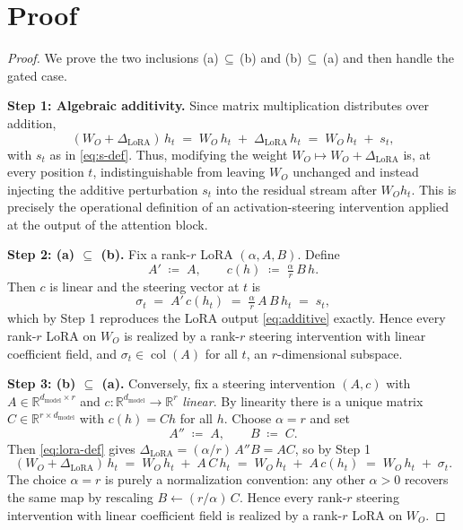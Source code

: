 \documentclass[11pt]{article}
\begin{document}
\section*{Proof}

\begin{proof}
We prove the two inclusions (a)\,$\subseteq$\,(b) and (b)\,$\subseteq$\,(a) and then handle the gated case.

\smallskip

\noindent\textbf{Step 1: Algebraic additivity.}
Since matrix multiplication distributes over addition,
\begin{equation}
(W_O + \Delta_{\mathrm{LoRA}})\, h_t
\;=\; W_O\, h_t \;+\; \Delta_{\mathrm{LoRA}}\, h_t
\;=\; W_O\, h_t \;+\; s_t,
\label{eq:algebra}
\end{equation}
with $s_t$ as in \eqref{eq:s-def}. Thus, modifying the weight $W_O \mapsto W_O + \Delta_{\mathrm{LoRA}}$ is, at every position $t$, indistinguishable from leaving $W_O$ unchanged and instead injecting the additive perturbation $s_t$ into the residual stream after $W_O h_t$. This is precisely the operational definition of an activation-steering intervention applied at the output of the attention block.

\smallskip

\noindent\textbf{Step 2: (a) $\subseteq$ (b).}
Fix a rank-$r$ LoRA $(\alpha, A, B)$. Define
\[
A' \;\coloneqq\; A, \qquad c(h) \;\coloneqq\; \tfrac{\alpha}{r}\, B\, h.
\]
Then $c$ is linear and the steering vector at $t$ is
\[
\sigma_t \;=\; A'\, c(h_t) \;=\; \tfrac{\alpha}{r}\, A\, B\, h_t \;=\; s_t,
\]
which by Step 1 reproduces the LoRA output \eqref{eq:additive} exactly. Hence every rank-$r$ LoRA on $W_O$ is realized by a rank-$r$ steering intervention with linear coefficient field, and $\sigma_t \in \operatorname{col}(A)$ for all $t$, an $r$-dimensional subspace.

\smallskip

\noindent\textbf{Step 3: (b) $\subseteq$ (a).}
Conversely, fix a steering intervention $(A, c)$ with $A \in \mathbb{R}^{d_{\mathrm{model}}\times r}$ and $c : \mathbb{R}^{d_{\mathrm{model}}} \to \mathbb{R}^r$ \emph{linear}. By linearity there is a unique matrix $C \in \mathbb{R}^{r \times d_{\mathrm{model}}}$ with $c(h) = C h$ for all $h$.
Choose $\alpha = r$ and set
\[
A'' \;\coloneqq\; A, \qquad B \;\coloneqq\; C.
\]
Then \eqref{eq:lora-def} gives $\Delta_{\mathrm{LoRA}} = (\alpha/r)\, A'' B = A C$, so by Step 1
\[
(W_O + \Delta_{\mathrm{LoRA}})\, h_t \;=\; W_O\, h_t \;+\; A\, C\, h_t \;=\; W_O\, h_t \;+\; A\, c(h_t) \;=\; W_O\, h_t \;+\; \sigma_t.
\]
The choice $\alpha = r$ is purely a normalization convention: any other $\alpha > 0$ recovers the same map by rescaling $B \leftarrow (r/\alpha)\, C$. Hence every rank-$r$ steering intervention with linear coefficient field is realized by a rank-$r$ LoRA on $W_O$.


\end{proof}
\end{document}
